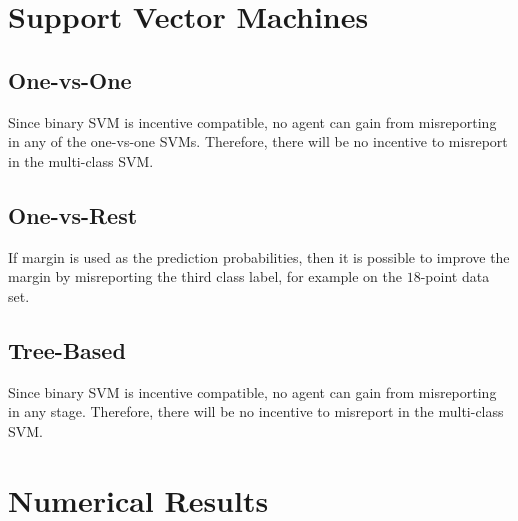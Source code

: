 \documentclass{article}
\begin{document}
\section{Support Vector Machines} 

\subsection{One-vs-One}
Since binary SVM is incentive compatible, no agent can gain from misreporting in any of the one-vs-one SVMs. Therefore, there will be no incentive to misreport in the multi-class SVM.
\newline \newline


\subsection{One-vs-Rest}
If margin is used as the prediction probabilities, then it is possible to improve the margin by misreporting the third class label, for example on the $18$-point data set.
\newline \newline


\subsection{Tree-Based}
Since binary SVM is incentive compatible, no agent can gain from misreporting in any stage. Therefore, there will be no incentive to misreport in the multi-class SVM.
\newline \newline




\section{Numerical Results} 
\end{document}
